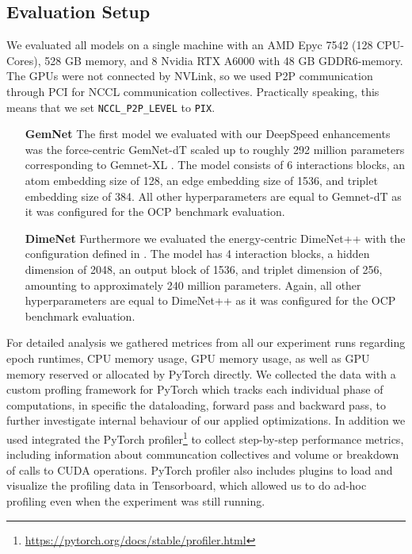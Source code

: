 \subsection{Evaluation Setup}

We evaluated all models on a single machine with an AMD Epyc 7542 (128 CPU-Cores), 528 GB memory, 
and 8 Nvidia RTX A6000 with 48 GB GDDR6-memory. The GPUs were not connected by NVLink, so we used 
P2P communication through PCI for NCCL communication collectives. Practically speaking, this 
means that we set \texttt{NCCL\_P2P\_LEVEL} to \texttt{PIX}.

\begin{enumerate}[align=left]
    \item[\textbf{GemNet}] The first model we evaluated with our DeepSpeed enhancements was 
    the force-centric GemNet-dT scaled up to roughly 292 million parameters corresponding to 
    Gemnet-XL \cite*{https://doi.org/10.48550/arxiv.2203.09697}. 
    The model consists of 6 interactions blocks, an atom embedding size of 128, an edge 
    embedding size of 1536, and triplet embedding size of 384. All other hyperparameters are equal 
    to Gemnet-dT as it was configured for the OCP benchmark evaluation.

    \item[\textbf{DimeNet}] Furthermore we evaluated the energy-centric DimeNet++ with the configuration 
    defined in \cite*{https://doi.org/10.48550/arxiv.2203.09697}. The model has 4 interaction blocks, a hidden 
    dimension of 2048, an output block of 1536, and triplet dimension of 256, amounting to approximately 
    240 million parameters. Again, all other hyperparameters are equal to DimeNet++ as it was configured 
    for the OCP benchmark evaluation.
\end{enumerate}

For detailed analysis we gathered metrices from all our experiment runs regarding epoch runtimes, 
CPU memory usage, GPU memory usage, as well as GPU memory reserved or allocated by PyTorch directly.
We collected the data with a custom profling framework for PyTorch which tracks each individual phase 
of computations, in specific the dataloading, forward pass and backward pass, to further investigate 
internal behaviour of our applied optimizations. 
In addition we used integrated the PyTorch profiler\footnote{\url{https://pytorch.org/docs/stable/profiler.html}}
to collect step-by-step performance metrics, including information about communcation collectives and 
volume or breakdown of calls to CUDA operations. PyTorch profiler also includes plugins to 
load and visualize the profiling data in Tensorboard, which allowed us to do ad-hoc profiling 
even when the experiment was still running.



